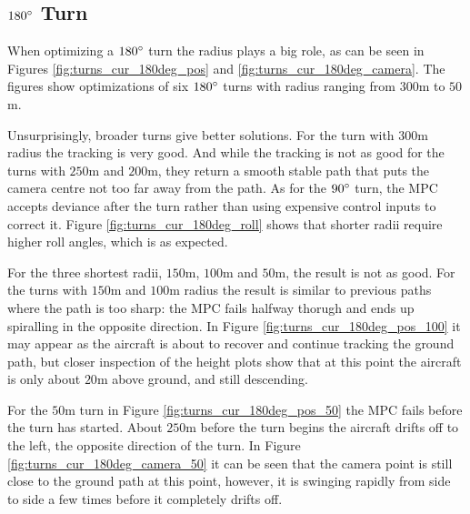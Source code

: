 \subsection{$180\degree$ Turn}
\label{subsec:180}

When optimizing a $180\degree$ turn the radius plays a big role, as can be seen in Figures \ref{fig:turns_cur_180deg_pos} and \ref{fig:turns_cur_180deg_camera}. The figures show optimizations of six $180\degree$ turns with radius ranging from $300$m to $50$m.

Unsurprisingly, broader turns give better solutions. For the turn with $300$m radius the tracking is very good. And while the tracking is not as good for the turns with $250$m and $200$m, they return a smooth stable path that puts the camera centre not too far away from the path. As for the $90\degree$ turn, the MPC accepts deviance after the turn rather than using expensive control inputs to correct it. Figure \ref{fig:turns_cur_180deg_roll} shows that shorter radii require higher roll angles, which is as expected.

For the three shortest radii, $150$m, $100$m and $50$m, the result is not as good. For the turns with $150$m and $100$m radius the result is similar to previous paths where the path is too sharp: the MPC fails halfway thorugh and ends up spiralling in the opposite direction. In Figure \ref{fig:turns_cur_180deg_pos_100} it may appear as the aircraft is about to recover and continue tracking the ground path, but closer inspection of the height plots show that at this point the aircraft is only about $20$m above ground, and still descending.

For the $50$m turn in Figure \ref{fig:turns_cur_180deg_pos_50} the MPC fails before the turn has started. About $250$m before the turn begins the aircraft drifts off to the left, the opposite direction of the turn. In Figure \ref{fig:turns_cur_180deg_camera_50} it can be seen that the camera point is still close to the ground path at this point, however, it is swinging rapidly from side to side a few times before it completely drifts off.

